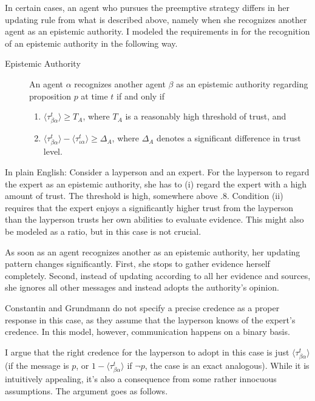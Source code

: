 \documentclass[11pt, a4paper]{scrartcl}
\begin{document}
In certain cases, an agent who pursues the preemptive strategy differs in her updating rule from what is described above, namely when she recognizes another agent as an epistemic authority. I modeled the requirements in \textcite[p.9]{Constantin2017} for the recognition of an epistemic authority in the following way. 
\begin{description} 
    \item[Epistemic Authority] An agent $\alpha$ recognizes another agent $\beta$ as an epistemic authority regarding proposition $p$ at time $t$ if and only if  
    \begin{enumerate}[label= (\roman*)]
        \item $\langle \tau^t_{\beta\alpha} \rangle \geqslant T_A$, where $T_A$ is a reasonably high threshold of trust, and
        \item $\langle \tau^t_{\beta\alpha} \rangle - \langle \tau^t_{\iota\alpha} \rangle \geqslant \Delta_A$, where $\Delta_A$ denotes a significant difference in trust level.
    \end{enumerate}


\end{description}
    In plain English: Consider a layperson and an expert. For the layperson to regard the expert as an epistemic authority, she has to (i) regard the expert with a high amount of trust. The threshold is high, somewhere above $.8$. Condition (ii) requires that the expert enjoys a significantly higher trust from the layperson than the layperson trusts her own abilities to evaluate evidence. This might also be modeled as a ratio, but in this case is not crucial.

As soon as an agent recognizes another as an epistemic authority, her updating pattern changes significantly. First, she stops to gather evidence herself completely. Second, instead of updating according to all her evidence and sources, she ignores all other messages and instead adopts the authority's opinion.

Constantin and Grundmann do not specify a precise credence as a proper response in this case, as they assume that the layperson knows of the expert's credence. In this model, however, communication happens on a binary basis.
 
I argue that the right credence for the layperson to adopt in this case is just $\langle \tau^t_{\beta\alpha} \rangle$ (if the message is $p$, or $1 - \langle \tau^t_{\beta\alpha} \rangle$ if $\neg p$, the case is an exact analogous). While it is intuitively appealing, it's also a consequence from some rather innocuous assumptions. The argument goes as follows. 
\end{document}
